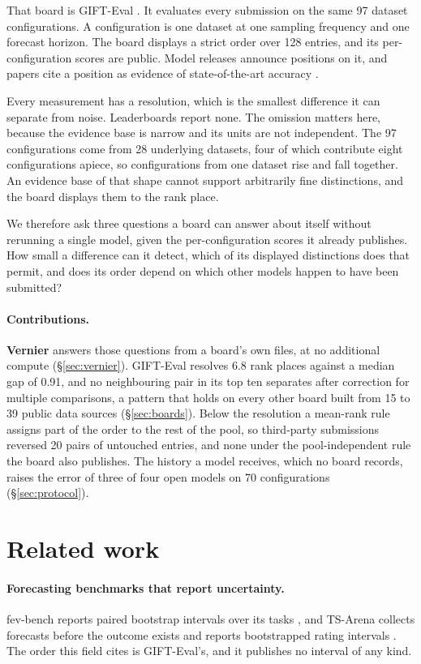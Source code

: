 \documentclass{article}
\begin{document}
That board is GIFT-Eval \citep{gifteval}. It evaluates every submission on the same 97
dataset configurations. A configuration is one dataset at one sampling frequency and one
forecast horizon. The board displays a strict order over 128 entries, and its
per-configuration scores are public. Model releases announce positions on it, and papers
cite a position as evidence of state-of-the-art accuracy \citep{timerouter}.

Every measurement has a resolution, which is the smallest difference it can separate from
noise. Leaderboards report none. The omission matters here, because the evidence base is
narrow and its units are not independent. The 97 configurations come from 28 underlying
datasets, four of which contribute eight configurations apiece, so configurations from one
dataset rise and fall together. An evidence base of that shape cannot support arbitrarily fine
distinctions, and the board displays them to the rank place.

We therefore ask three questions a board can answer about itself without rerunning a single
model, given the per-configuration scores it already publishes. How small a difference can
it detect, which of its displayed distinctions does that permit, and does its order depend
on which other models happen to have been submitted?

\paragraph{Contributions.} \textbf{Vernier} answers those questions from a board's own
files, at no additional compute (\S\ref{sec:vernier}). GIFT-Eval resolves 6.8 rank places
against a median gap of 0.91, and no neighbouring pair in its top ten separates after
correction for multiple comparisons, a pattern that holds on every other board built from 15
to 39 public data sources (\S\ref{sec:boards}). Below the resolution a mean-rank rule assigns part of the order to the
rest of the pool, so third-party submissions reversed 20 pairs of untouched entries, and
none under the pool-independent rule the board also publishes. The history a model receives,
which no board records, raises the error of three of four open models on 70 configurations
(\S\ref{sec:protocol}).

\section{Related work}

\paragraph{Forecasting benchmarks that report uncertainty.} fev-bench reports paired
bootstrap intervals over its tasks \citep{fevbench}, and TS-Arena collects forecasts before
the outcome exists and reports bootstrapped rating intervals \citep{tsarena}. The order this field cites is GIFT-Eval's, and it publishes no
interval of any kind.
\end{document}
